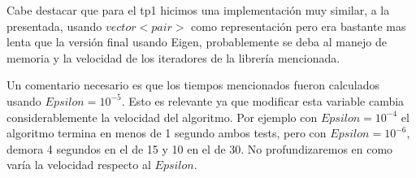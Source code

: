 \vspace{1em}
Cabe destacar que para el tp1 hicimos una implementación muy similar, a la presentada, usando $vector<pair>$ como representación pero era bastante mas lenta que la versión final usando Eigen, probablemente se deba al manejo de memoria y la velocidad de los iteradores de la librería mencionada.

\vspace{1em}
Un comentario necesario es que los tiempos mencionados fueron calculados usando $Epsilon = 10^{-5}$. Esto es relevante ya que modificar esta variable cambia considerablemente la velocidad del algoritmo. Por ejemplo con $Epsilon = 10^{-4}$ el algoritmo termina en menos de 1 segundo ambos tests, pero con $Epsilon = 10^{-6}$, demora 4 segundos en el de 15 y 10 en el de 30. No profundizaremos en como varía la velocidad respecto al $Epsilon$.
